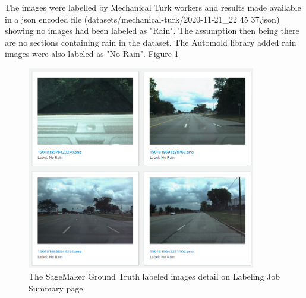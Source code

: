 The images were labelled by Mechanical Turk workers and results made available in a json encoded file (datasets/mechanical-turk/2020-11-21\_22 45 37.json) showing no images had been labeled as "Rain". The assumption then being there are no sections containing rain in the dataset. The Automold library added rain images were also labeled as "No Rain". Figure \ref{fig:MechTurkLabeledImages}
\begin{figure}[h!]
\centering
\includegraphics[width=10cm]{Figures/MechTurkLabeledImages.png}
\caption{The SageMaker Ground Truth labeled images detail on Labeling Job Summary page}
\label{fig:MechTurkLabeledImages}
\end{figure}

